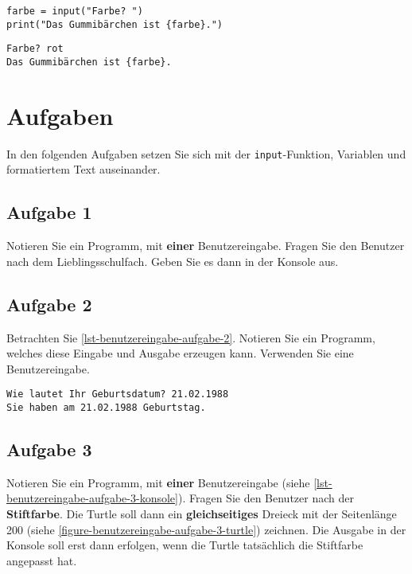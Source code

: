 \begin{lstlisting}[caption={Der Text wird so \textbf{nicht} korrekt formatiert. (\graybgtexttt{f-text\_bsp\_4.py}).}, label={lst-f-text-example-4}]
farbe = input("Farbe? ")
print("Das Gummibärchen ist {farbe}.")
\end{lstlisting}

\begin{lstlisting}[caption={Die Ausgabe entspricht $1:1$ dem Text, jedes Zeichen wird ausgegeben.}, label=lst-f-text-example-output-2, language=output]
Farbe? rot
Das Gummibärchen ist {farbe}.
\end{lstlisting}

\section{Aufgaben}

In den folgenden Aufgaben setzen Sie sich mit der \lstinline{input}-Funktion, Variablen und formatiertem Text auseinander.

\subsection{Aufgabe 1}

Notieren Sie ein Programm, mit \textbf{einer} Benutzereingabe. Fragen Sie den Benutzer nach dem Lieblingsschulfach. Geben Sie es dann in der Konsole aus.

\fillwithgrid{1in}

\subsection{Aufgabe 2}

Betrachten Sie \autoref{lst-benutzereingabe-aufgabe-2}. Notieren Sie ein Programm, welches diese Eingabe und Ausgabe erzeugen kann. Verwenden Sie eine Benutzereingabe.

\begin{lstlisting}[caption={Eingabe und Ausgabe in der Konsole.}, label=lst-benutzereingabe-aufgabe-2, language=output]
Wie lautet Ihr Geburtsdatum? 21.02.1988
Sie haben am 21.02.1988 Geburtstag.
\end{lstlisting}

\subsection{Aufgabe 3}

Notieren Sie ein Programm, mit \textbf{einer} Benutzereingabe (siehe \autoref{lst-benutzereingabe-aufgabe-3-konsole}). Fragen Sie den Benutzer nach der \textbf{Stiftfarbe}. Die Turtle soll dann ein \textbf{gleichseitiges} Dreieck mit der Seitenlänge \num{200} (siehe \autoref{figure-benutzereingabe-aufgabe-3-turtle}) zeichnen. Die Ausgabe in der Konsole soll erst dann erfolgen, wenn die Turtle tatsächlich die Stiftfarbe angepasst hat.

